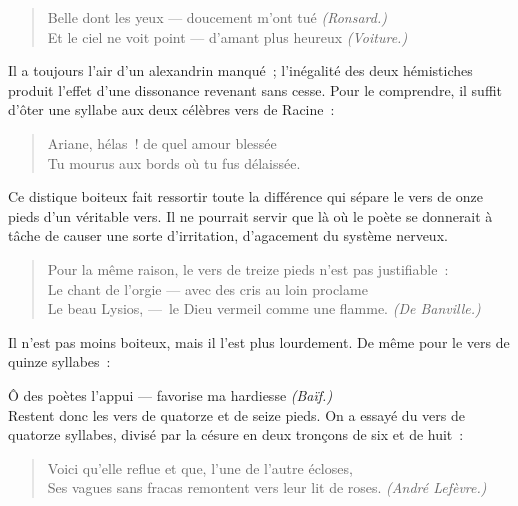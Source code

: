 \documentclass[french,twoside]{book} %
\begin{document}
\begin{verse}
Belle dont les yeux — doucement m’ont tué \emph{(Ronsard.)}\\
Et le ciel ne voit point — d’amant plus heureux \emph{(Voiture.)}\\
\end{verse}

\noindent Il a toujours l’air d’un alexandrin manqué ; l’inégalité des deux hémistiches produit l’effet d’une dissonance revenant  sans cesse. Pour le comprendre, il suffit d’ôter une syllabe aux deux célèbres vers de Racine :\par


\begin{verse}
Ariane, hélas ! de quel amour blessée\\
Tu mourus aux bords où tu fus délaissée.\\
\end{verse}

\noindent Ce distique boiteux fait ressortir toute la différence qui sépare le vers de onze pieds d’un véritable vers. Il ne pourrait servir que là où le poète se donnerait à tâche de causer une sorte d’irritation, d’agacement du système nerveux.\par


\begin{verse}
Pour la même raison, le vers de treize pieds n’est pas justifiable :\\
Le chant de l’orgie — avec des cris au loin proclame\\
Le beau Lysios, — le Dieu vermeil comme une flamme. \emph{(De Banville.)}\\
\end{verse}

\noindent Il n’est pas moins boiteux, mais il l’est plus lourdement. De même pour le vers de quinze syllabes :\par

Ô des poètes l’appui — favorise ma hardiesse \emph{(Baïf.)}\\

\noindent Restent donc les vers de quatorze et de seize pieds. On a essayé du vers de quatorze syllabes, divisé par la césure en deux tronçons de six et de huit :\par


\begin{verse}
Voici qu’elle reflue et que, l’une de l’autre écloses,\\
Ses vagues sans fracas remontent vers leur lit de roses. \emph{(André Lefèvre.)}\\
\end{verse}
\end{document}
